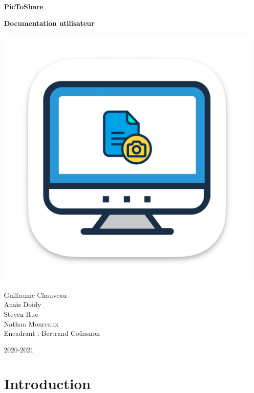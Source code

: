 \documentclass[a4paper,11pt]{article}
\begin{document}
	\begin{titlepage}
		\begin{center}
			\vspace{0.5cm}
			
			\Huge
			\textbf{PicToShare}
			
			\vspace{0.5cm}
			\textbf{Documentation utilisateur}
			
			\includegraphics[width=\textwidth]{PTS_icon}
			
			\Large
			Guillaume Chauveau \\
			Anaïs Doidy \\
			Steven Hue \\
			Nathan Moureaux\\
			
			\vspace{1cm}
			Encadrant : Bertrand Coüasnon
			
			\vspace{1cm}
			2020-2021
				
		\end{center}
	
	\end{titlepage}
	

	\section{Introduction}
	
\end{document}
